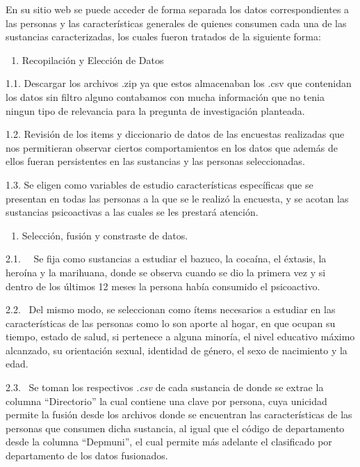 \documentclass[
]{article}
\providecommand{\tightlist}{%
  \setlength{\itemsep}{0pt}\setlength{\parskip}{0pt}}
\begin{document}
En su sitio web se puede acceder de forma separada los datos
correspondientes a las personas y las características generales de
quienes consumen cada una de las sustancias caracterizadas, los cuales
fueron tratados de la siguiente forma:

\begin{enumerate}
\def\labelenumi{\arabic{enumi}.}
\tightlist
\item
  Recopilación y Elección de Datos
\end{enumerate}

1.1. Descargar los archivos .zip ya que estos almacenaban los .csv que
contenidan los datos sin filtro alguno contabamos con mucha información
que no tenia ningun tipo de relevancia para la pregunta de investigación
planteada.

1.2. Revisión de los items y diccionario de datos de las encuestas
realizadas que nos permitieran observar ciertos comportamientos en los
datos que además de ellos fueran persistentes en las sustancias y las
personas seleccionadas.

1.3. Se eligen como variables de estudio características específicas que
se presentan en todas las personas a la que se le realizó la encuesta, y
se acotan las sustancias psicoactivas a las cuales se les prestará
atención.

\begin{enumerate}
\def\labelenumi{\arabic{enumi}.}
\setcounter{enumi}{1}
\tightlist
\item
  Selección, fusión y constraste de datos.
\end{enumerate}

2.1.~~ Se fija como sustancias a estudiar el bazuco, la cocaína, el
éxtasis, la heroína y la marihuana, donde se observa cuando se dio la
primera vez y si dentro de los últimos 12 meses la persona había
consumido el psicoactivo.

2.2.~ Del mismo modo, se seleccionan como ítems necesarios a estudiar en
las características de las personas como lo son aporte al hogar, en que
ocupan su tiempo, estado de salud, si pertenece a alguna minoría, el
nivel educativo máximo alcanzado, su orientación sexual, identidad de
género, el sexo de nacimiento y la edad.

2.3.~ Se toman los respectivos \emph{.csv} de cada sustancia de donde se
extrae la columna ``Directorio'' la cual contiene una clave por persona,
cuya unicidad permite la fusión desde los archivos donde se encuentran
las características de las personas que consumen dicha sustancia, al
igual que el código de departamento desde la columna ``Depmuni'', el
cual permite más adelante el clasificado por departamento de los datos
fusionados.
\end{document}
